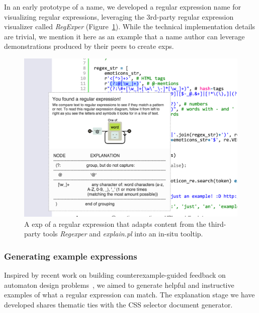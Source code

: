 In an early prototype of a \Gls{name}, we developed a regular expression \Gls{name} for visualizing regular expressions, leveraging the 3rd-party regular expression visualizer called \emph{RegExper} (Figure~\ref{fig:regex_visualization}).
While the technical implementation details are trivial, we mention it here as an example that a \Gls{name} author can leverage demonstrations produced by their peers to create \glspl{exp}.

\begin{figure}
\centering
\includegraphics[width=\columnwidth]{figures/explain_on_select}
\caption{A \gls{exp} of a regular expression that adapts content from the third-party tools \emph{Regexper} and \emph{explain.pl} into an in-situ tooltip.}
\label{fig:regex_visualization}
\end{figure}

\subsubsection{Generating example expressions}

Inspired by recent work on building counterexample-guided feedback on automaton design problems~\cite{dantoni_how_2015}, we aimed to generate helpful and instructive examples of what a regular expression can match.
The explanation stage we have developed shares thematic ties with the CSS selector document generator. 
\fi

